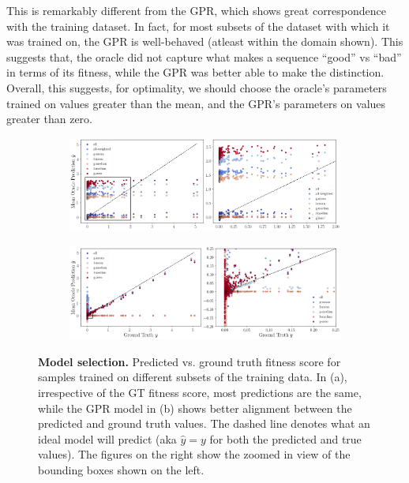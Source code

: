 \documentclass{article}
\begin{document}
This is remarkably different from the GPR, which shows great correspondence with
the training dataset. In fact, for most subsets of the dataset with which it was
trained on, the GPR is well-behaved (atleast within the domain shown). This
suggests that, the oracle did not capture what makes a sequence ``good'' vs
``bad'' in terms of its fitness, while the GPR was better able to make the
distinction. Overall, this suggests, for optimality, we should choose the
oracle's parameters trained on values greater than the mean, and the GPR's
parameters on values greater than zero.

\begin{figure}[htbp]
  \centering
  \begin{subfigure}[b]{\linewidth}
    \centering
    \includegraphics[width=\linewidth]{figures/oracle_pred_vs_gt.png}
    \caption{}
  \end{subfigure}
  \vspace{2mm}
  \begin{subfigure}[b]{\linewidth}
    \centering
    \includegraphics[width=\linewidth]{figures/gpr_pred_vs_gt.png}
    \caption{}
  \end{subfigure}
  \caption{\textbf{Model selection.} Predicted vs. ground truth fitness score
    for samples trained on different subsets of the training data. In (a),
    irrespective of the GT fitness score, most predictions are the same, while
    the GPR model in (b) shows better alignment between the predicted and ground
    truth values. The dashed line denotes what an ideal model will predict (aka
    $\hat{y} = y$ for both the predicted and true values). The figures on the
    right show the zoomed in view of the bounding boxes shown on the left.}
  \label{fig:model_selection}
\end{figure}
\end{document}
